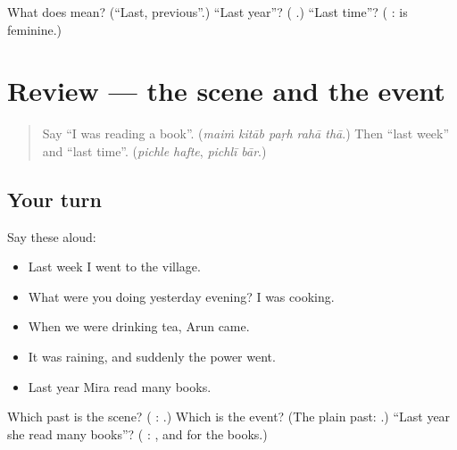\begin{tcolorbox}[breakable,colback=teal!4,colframe=teal!35!black,title={Before you move on}]
What does \textbf{} mean? (\textquotedblleft{}Last, previous\textquotedblright{}.) \textquotedblleft{}Last year\textquotedblright{}? (\textbf{ }.) \textquotedblleft{}Last time\textquotedblright{}? (\textbf{ }: \textbf{} is feminine.)
\end{tcolorbox}
\section[(review)]{Review — the scene and the event}

\label{lesson:HI-R278-the-scene-and-the-event}



\begin{quote}
Say \textquotedblleft{}I was reading a book\textquotedblright{}. (\emph{maiṁ kitāb paṛh rahā thā}.) Then \textquotedblleft{}last week\textquotedblright{} and \textquotedblleft{}last time\textquotedblright{}. (\emph{pichle hafte}, \emph{pichlī bār}.)
\end{quote}

\subsection*{Your turn}
Say these aloud:

\begin{itemize}
\raggedright
  \item Last week I went to the village.
  \item What were you doing yesterday evening? I was cooking.
  \item When we were drinking tea, Arun came.
  \item It was raining, and suddenly the power went.
  \item Last year Mira read many books.
\end{itemize}

\begin{tcolorbox}[breakable,colback=teal!4,colframe=teal!35!black,title={Before you move on}]
Which past is the scene? (\textbf{ }: \textbf{   }.) Which is the event? (The plain past: \textbf{ }.) \textquotedblleft{}Last year she read many books\textquotedblright{}? (\textbf{     }: \textbf{}, and \textbf{} for the books.)
\end{tcolorbox}
